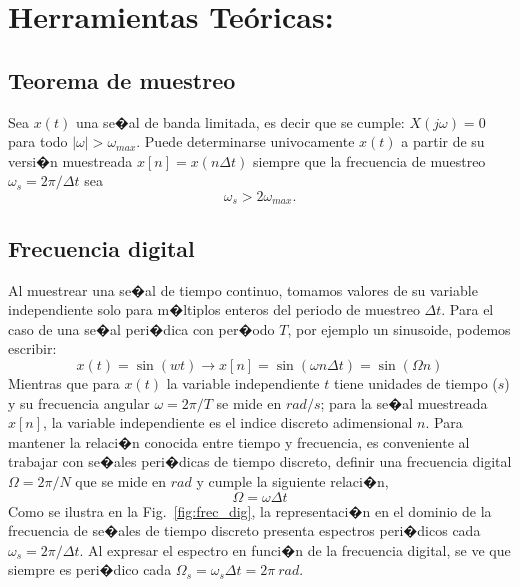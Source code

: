 \documentclass[10pt,a4paper]{article}
\begin{document}
\section*{Herramientas Te\'oricas:}
\label{sec:herr}

\subsection*{Teorema de muestreo}
Sea $x(t)$ una se�al de banda limitada, es decir que se cumple: $X(j\omega)=0$ para todo $|\omega|>\omega_{max}$. Puede 
determinarse univocamente $x(t)$ a partir de su versi�n muestreada $x[n]=x(n\Delta t)$ siempre que la frecuencia de 
muestreo $\omega_s=2\pi/\Delta t$ sea 
\begin{equation}\label{eq:teorema_muestreo}
\omega_s>2\omega_{max}.
\end{equation}

\subsection*{Frecuencia digital}

Al muestrear una se�al de tiempo continuo, tomamos valores de su variable independiente solo 
para m�ltiplos enteros del periodo de muestreo $\Delta t$. Para el caso de una se�al peri�dica con per�odo $T$, por 
ejemplo un sinusoide, podemos escribir:
\begin{equation}
x(t)=\sin(wt)\to x[n]=\sin(\omega n\Delta t)=\sin(\Omega n)
\end{equation} 
Mientras que para $x(t)$ la variable independiente $t$ tiene unidades de tiempo ($s$) y su frecuencia angular 
$\omega=2\pi/T$ se mide en $rad/s$; para la se�al muestreada $x[n]$, la variable independiente es el indice discreto 
adimensional $n$. Para mantener la relaci�n conocida entre tiempo y frecuencia, es conveniente  al trabajar con se�ales 
peri�dicas de tiempo discreto, definir una frecuencia digital $\Omega=2\pi/N$ que se mide en $rad$ y cumple la 
siguiente relaci�n,
\begin{equation}
\Omega=\omega \Delta t
\end{equation} 
Como se ilustra en la Fig.~\ref{fig:frec_dig}, la representaci�n en el dominio de la frecuencia de se�ales de 
tiempo discreto presenta espectros peri�dicos cada $\omega_s=2\pi/\Delta t$. Al expresar el espectro en funci�n de la 
frecuencia digital, se ve que siempre es peri�dico cada  $\Omega_{s}=\omega_{s}\Delta t=2\pi~rad$. 
\end{document}
